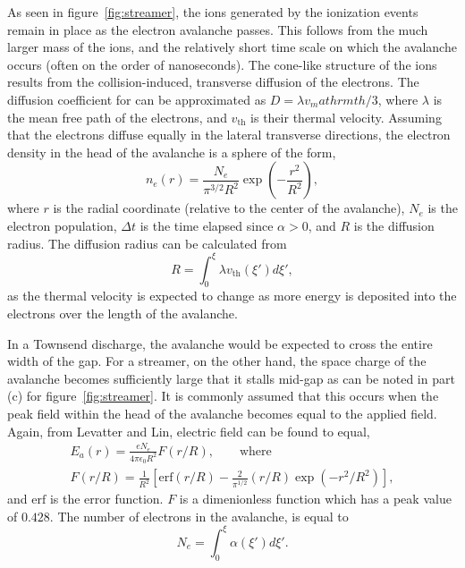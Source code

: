 {As seen in figure~\ref{fig:streamer}, the ions generated by the ionization
events remain in place as the electron avalanche passes. This follows from the
much larger mass of the ions, and the relatively short time scale on which the
avalanche occurs (often on the order of nanoseconds). The cone-like structure of
the ions results from the collision-induced, transverse diffusion of the
electrons. The diffusion coefficient for can be approximated as $D = \lambda
v_mathrm{th}/3$, where $\lambda$ is the mean free path of the electrons, and
$v_\mathrm{th}$ is their thermal velocity. Assuming that the electrons diffuse
equally in the lateral transverse directions, the electron density in the head
of the avalanche is a sphere of the form,
\begin{equation}
  n_e(r) = \frac{N_e}{\pi^{3/2}R^2}\exp\left(-\frac{r^2}{R^2}\right),
  \label{eq:s_density}
\end{equation}
where $r$ is the radial coordinate (relative to the center of the avalanche),
$N_e$ is the electron population, $\Delta t$ is the time elapsed since $\alpha >
0$, and $R$ is the diffusion radius. The diffusion radius can be calculated from
\begin{equation}
  R = \int_{0}^{\xi} \lambda v_\mathrm{th}(\xi') d\xi',
  \label{eq:s_rad}
\end{equation}
as the thermal velocity is expected to change as more energy is deposited into
the electrons over the length of the avalanche.

In a Townsend discharge, the avalanche would be expected to cross the entire
width of the gap. For a streamer, on the other hand, the space charge of the
avalanche becomes sufficiently large that it stalls mid-gap as can be noted in
part (c) for figure~\ref{fig:streamer}. It is commonly assumed that this occurs
when the peak field within the head of the avalanche becomes equal to the
applied field. Again, from Levatter and Lin, electric field can be found to
equal,
\begin{eqnarray}
  E_a(r) = \frac{eN_e}{4\pi\epsilon_0R^2} F(r/R), \qquad \mathrm{where} \\
  F(r/R) = \frac{1}{R^2}\left[\mathrm{erf}(r/R)-\frac{2}{\pi^{1/2}}
           (r/R)\exp(-r^2/R^2)\right] ,
\end{eqnarray}
and $\mathrm{erf}$ is the error function. $F$ is a dimenionless function which
has a peak value of $0.428$. The number of electrons in the avalanche, is equal
to
\begin{equation}
  N_e = \int_0^\xi \alpha(\xi')d\xi'.
  \label{eq:s_pop}
\end{equation}

}
